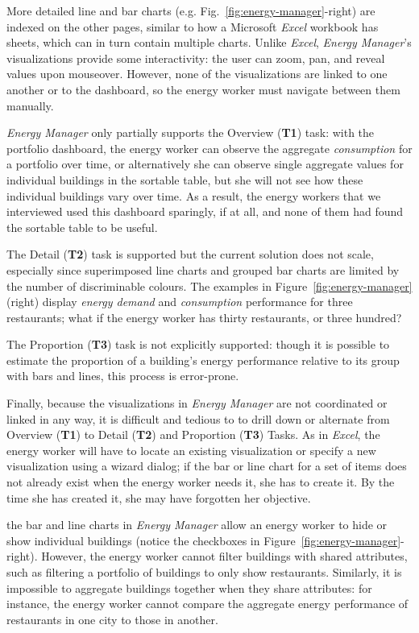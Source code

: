\documentclass[journal]{vgtc}                %
\newcommand{\bstart}[1]{\vspace{1mm} \noindent{\textbf{#1:}}}
\begin{document}
More detailed line and bar charts (e.g. Fig.~\ref{fig:energy-manager}-right) are indexed on the other pages, similar to how a Microsoft {\it Excel} workbook has sheets, which can in turn contain multiple charts. 
Unlike {\it Excel}, {\it Energy Manager}'s visualizations provide some interactivity: the user can zoom, pan, and reveal values upon mouseover. 
However, none of the visualizations are linked to one another or to the dashboard, so the energy worker must navigate between them manually.

\bstart{Task support} {\it Energy Manager} only partially supports the Overview ({\bf T1}) task: with the portfolio dashboard, the energy worker can observe the aggregate {\it consumption} for a portfolio over time, or alternatively she can observe single aggregate values for individual buildings in the sortable table, but she will not see how these individual buildings vary over time.
As a result, the energy workers that we interviewed used this dashboard sparingly, if at all, and none of them had found the sortable table to be useful.

The Detail ({\bf T2}) task is supported but the current solution does not scale, especially since superimposed line charts and grouped bar charts are limited by the number of discriminable colours.
The examples in Figure~\ref{fig:energy-manager} (right) display {\it energy demand} and {\it consumption} performance for three restaurants; what if the energy worker has thirty restaurants, or three hundred?

The Proportion ({\bf T3}) task is not explicitly supported: though it is possible to estimate the proportion of a building's energy performance relative to its group with bars and lines, this process is error-prone.

Finally, because the visualizations in {\it Energy Manager} are not coordinated or linked in any way, it is difficult and tedious to to drill down or alternate from Overview ({\bf T1}) to Detail ({\bf T2}) and Proportion ({\bf T3}) Tasks. 
As in {\it Excel}, the energy worker will have to locate an existing visualization or specify a new visualization using a wizard dialog; if the bar or line chart for a set of items does not already exist when the energy worker needs it, she has to create it. 
By the time she has created it, she may have forgotten her objective.

\bstart{Limited filtering and aggregation} the bar and line charts in {\it Energy Manager} allow an energy worker to hide or show individual buildings (notice the checkboxes in Figure~\ref{fig:energy-manager}-right).
However, the energy worker cannot filter buildings with shared attributes, such as filtering a portfolio of buildings to only show restaurants.
Similarly, it is impossible to aggregate buildings together when they share attributes: for instance, the energy worker cannot compare the aggregate energy performance of restaurants in one city to those in another.
\end{document}
